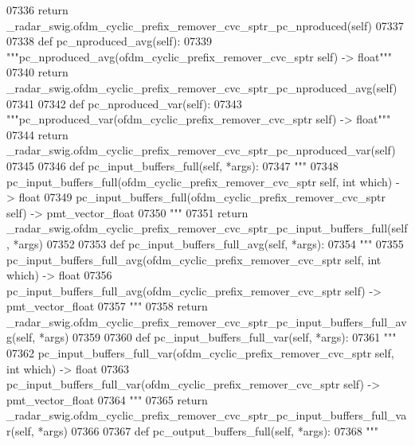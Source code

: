 \begin{DoxyCode}
{{{{{{{{{{{{{{{{{{{{{{{{07336         \textcolor{keywordflow}{return} \_radar\_swig.ofdm\_cyclic\_prefix\_remover\_cvc\_sptr\_pc\_nproduced(self)
07337 
07338     \textcolor{keyword}{def }pc_nproduced_avg(self):
07339         \textcolor{stringliteral}{"""pc\_nproduced\_avg(ofdm\_cyclic\_prefix\_remover\_cvc\_sptr self) -> float"""}
07340         \textcolor{keywordflow}{return} \_radar\_swig.ofdm\_cyclic\_prefix\_remover\_cvc\_sptr\_pc\_nproduced\_avg(self)
07341 
07342     \textcolor{keyword}{def }pc_nproduced_var(self):
07343         \textcolor{stringliteral}{"""pc\_nproduced\_var(ofdm\_cyclic\_prefix\_remover\_cvc\_sptr self) -> float"""}
07344         \textcolor{keywordflow}{return} \_radar\_swig.ofdm\_cyclic\_prefix\_remover\_cvc\_sptr\_pc\_nproduced\_var(self)
07345 
07346     \textcolor{keyword}{def }pc_input_buffers_full(self, *args):
07347         \textcolor{stringliteral}{"""}
07348 \textcolor{stringliteral}{        pc\_input\_buffers\_full(ofdm\_cyclic\_prefix\_remover\_cvc\_sptr self, int which) -> float}
07349 \textcolor{stringliteral}{        pc\_input\_buffers\_full(ofdm\_cyclic\_prefix\_remover\_cvc\_sptr self) -> pmt\_vector\_float}
07350 \textcolor{stringliteral}{        """}
07351         \textcolor{keywordflow}{return} \_radar\_swig.ofdm\_cyclic\_prefix\_remover\_cvc\_sptr\_pc\_input\_buffers\_full(self, *args)
07352 
07353     \textcolor{keyword}{def }pc_input_buffers_full_avg(self, *args):
07354         \textcolor{stringliteral}{"""}
07355 \textcolor{stringliteral}{        pc\_input\_buffers\_full\_avg(ofdm\_cyclic\_prefix\_remover\_cvc\_sptr self, int which) -> float}
07356 \textcolor{stringliteral}{        pc\_input\_buffers\_full\_avg(ofdm\_cyclic\_prefix\_remover\_cvc\_sptr self) -> pmt\_vector\_float}
07357 \textcolor{stringliteral}{        """}
07358         \textcolor{keywordflow}{return} \_radar\_swig.ofdm\_cyclic\_prefix\_remover\_cvc\_sptr\_pc\_input\_buffers\_full\_avg(self, *args)
07359 
07360     \textcolor{keyword}{def }pc_input_buffers_full_var(self, *args):
07361         \textcolor{stringliteral}{"""}
07362 \textcolor{stringliteral}{        pc\_input\_buffers\_full\_var(ofdm\_cyclic\_prefix\_remover\_cvc\_sptr self, int which) -> float}
07363 \textcolor{stringliteral}{        pc\_input\_buffers\_full\_var(ofdm\_cyclic\_prefix\_remover\_cvc\_sptr self) -> pmt\_vector\_float}
07364 \textcolor{stringliteral}{        """}
07365         \textcolor{keywordflow}{return} \_radar\_swig.ofdm\_cyclic\_prefix\_remover\_cvc\_sptr\_pc\_input\_buffers\_full\_var(self, *args)
07366 
07367     \textcolor{keyword}{def }pc_output_buffers_full(self, *args):
07368         \textcolor{stringliteral}{"""}
}}}}}}}}}}}}}}}}}}}}}}}}
\end{DoxyCode}
